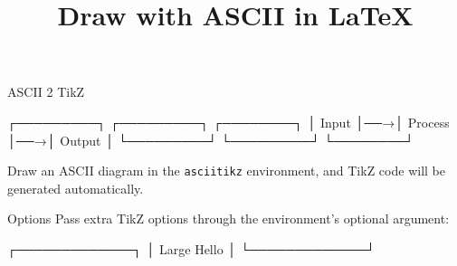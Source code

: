 \documentclass[aspectratio=169]{beamer}
\title{Draw with ASCII in LaTeX}
\author{}
\date{}
\begin{document}
\begin{frame}[fragile]{ASCII 2 TikZ}
  \centering
  \begin{asciitikz}
    ┌─────────┐   ┌─────────┐   ┌────────┐
    │  Input  │──→│ Process │──→│ Output │
    └─────────┘   └─────────┘   └────────┘
  \end{asciitikz}

  \medskip
  Draw an ASCII diagram in the \texttt{asciitikz} environment, and TikZ code will be
  generated automatically.
\end{frame}

\begin{frame}[fragile]{Options}
  Pass extra TikZ options through the environment's optional argument:
  \centering
  \begin{asciitikz}[scale=4, transform shape]
    ┌─────────────┐
    │ Large Hello │
    └─────────────┘
  \end{asciitikz}
  \medskip
\end{frame}
\end{document}
